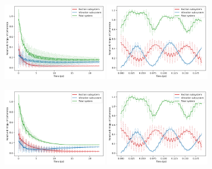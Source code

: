 \documentclass[11pt]{article}
\begin{document}
\begin{figure}[H]
    \centering

    \begin{subfigure}{\textwidth}
        \centering
        \includegraphics[width=0.49\textwidth]{Research Project/Code/results/ExVib/Open/Coherence/Envelope/coh_spont_eg.png}
        \hfill
        \includegraphics[width=0.49\textwidth]{Research Project/Code/results/ExVib/Open/Coherence/Fast/coh_spont_eg.png}
        \caption{}
        \label{fig:EVM_OQS_Coh_spont_eg}
    \end{subfigure}

    \vspace{0.8em}

    \begin{subfigure}{\textwidth}
        \centering
        \includegraphics[width=0.49\textwidth]{Research Project/Code/results/ExVib/Open/Coherence/Envelope/coh_therm_eg.png}
        \hfill
        \includegraphics[width=0.49\textwidth]{Research Project/Code/results/ExVib/Open/Coherence/Fast/coh_therm_eg.png}
        \caption{}
        \label{fig:EVM_OQS_Coh_therm_eg}
    \end{subfigure}


\end{figure}
\end{document}
